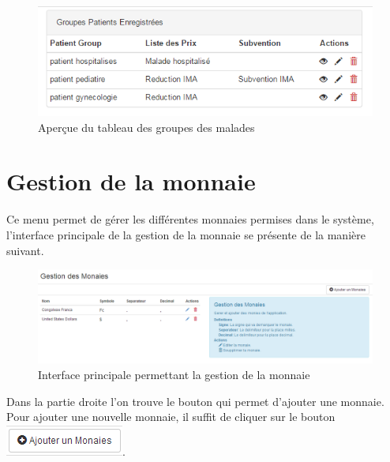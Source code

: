 \documentclass[12pt,a4paper]{report}
\begin{document}
\begin{figure}[h]
\begin{center}
\includegraphics[width=12cm]{pic/TabGroupMalade.png}
\end{center}
\caption{Aperçue du tableau des groupes des malades}
\label{Aperçue du tableau des groupes des malades}
\end{figure}
\newpage

\section{Gestion de la monnaie}
Ce menu permet de gérer les différentes monnaies permises dans le système, l'interface principale de la gestion de la monnaie se présente de la manière suivant.

\begin{figure}[h]
\begin{center}
\includegraphics[width=16cm]{pic/AdminCurrency.png}
\end{center}
\caption{Interface principale permettant la gestion de la monnaie}
\label{Interface principale permettant la gestion de la monnaie}
\end{figure}

Dans la partie droite l'on trouve le bouton qui permet d'ajouter une monnaie. Pour ajouter une nouvelle monnaie, il suffit de cliquer sur le bouton \includegraphics[scale=0.7]{pic/AddMonney.png}.
\end{document}
